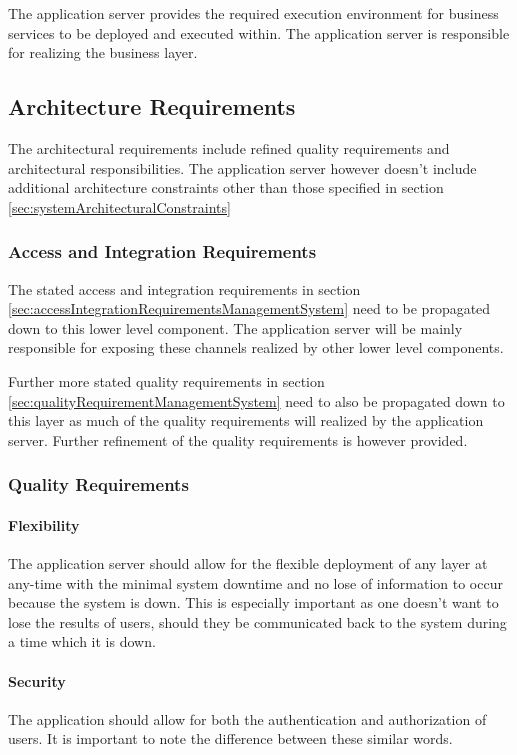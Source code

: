 The application server provides the required execution environment for business
services to be deployed and executed within. The application server is responsible
for realizing the business layer.

\subsection{Architecture Requirements}
The architectural requirements include refined quality requirements and architectural
responsibilities. The application server however doesn't include additional
architecture constraints other than those specified in section \ref{sec:systemArchitecturalConstraints}

\subsubsection{Access and Integration Requirements}
The stated access and integration requirements in section \ref{sec:accessIntegrationRequirementsManagementSystem}
need to be propagated down to this lower level component. The application server
will be mainly responsible for exposing these channels realized by other lower
level components.

Further more stated quality requirements in section \ref{sec:qualityRequirementManagementSystem}
need to also be propagated down to this layer as much of the quality
requirements will realized by the application server. Further refinement of the
quality requirements is however provided.

\subsubsection{Quality Requirements}
\paragraph{Flexibility}
The application server should allow for the flexible deployment of any layer at
any-time with the minimal system downtime and no lose of information to occur
because the system is down. This is especially important as one doesn't want to
lose the results of users, should they be communicated back to the system
during a time which it is down.

\paragraph{Security}
The application should allow for both the authentication and authorization of
users. It is important to note the difference between these similar words.

